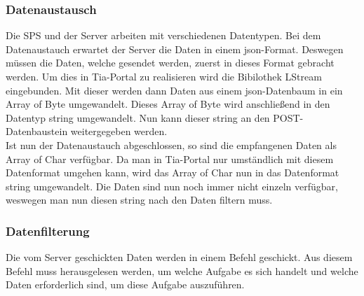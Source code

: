     \subsubsection{Datenaustausch}
    \label{Datenaustausch}
    Die SPS und der Server arbeiten mit verschiedenen Datentypen. Bei dem Datenaustauch erwartet der Server die Daten in einem json-Format. Deswegen müssen die Daten, welche gesendet werden, zuerst in dieses Format gebracht werden. Um dies in Tia-Portal zu realisieren wird die Bibilothek LStream eingebunden. Mit dieser werden dann Daten aus einem json-Datenbaum in ein Array of Byte umgewandelt. Dieses Array of Byte wird anschließend in den Datentyp string umgewandelt. Nun kann dieser string an den POST-Datenbaustein weitergegeben werden. \\
    Ist nun der Datenaustauch abgeschlossen, so sind die empfangenen Daten als Array of Char verfügbar. Da man in Tia-Portal nur umständlich mit diesem Datenformat umgehen kann, wird das Array of Char nun in das Datenformat string umgewandelt. Die Daten sind nun noch immer nicht einzeln verfügbar, weswegen man nun diesen string nach den Daten filtern muss.

    \subsubsection{Datenfilterung}
    Die vom Server geschickten Daten werden in einem Befehl geschickt. Aus diesem Befehl muss herausgelesen werden, um welche Aufgabe es sich handelt  und welche Daten erforderlich sind, um diese Aufgabe auszuführen.

